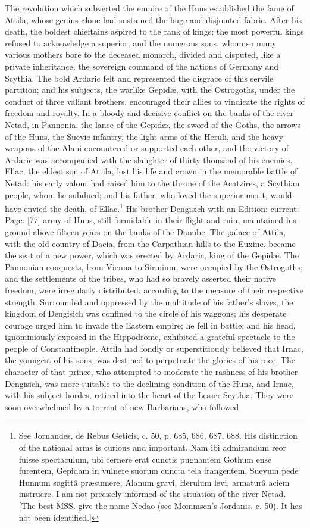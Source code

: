 The revolution which subverted the empire of the Huns established the fame of Attila, whose genius alone had sustained the huge and disjointed fabric. After his death, the boldest chieftains aspired to the rank of kings; the most powerful kings refused to acknowledge a superior; and the numerous sons, whom so many various mothers bore to the deceased monarch, divided and disputed, like a private inheritance, the sovereign command of the nations of Germany and Scythia. The bold Ardaric felt and represented the disgrace of this servile partition; and his subjects, the warlike Gepidæ, with the Ostrogoths, under the conduct of three valiant brothers, encouraged their allies to vindicate the rights of freedom and royalty. In a bloody and decisive conflict on the banks of the river Netad, in Pannonia, the lance of the Gepidæ, the sword of the Goths, the arrows of the Huns, the Suevic infantry, the light arms of the Heruli, and the heavy weapons of the Alani encountered or supported each other, and the victory of Ardaric was accompanied with the slaughter of thirty thousand of his enemies. Ellac, the eldest son of Attila, lost his life and crown in the memorable battle of Netad: his early valour had raised him to the throne of the Acatzires, a Scythian people, whom he subdued; and his father, who loved the superior merit, would have envied the death, of Ellac.\footnote{See Jornandes, de Rebus Geticis, c. 50, p. 685, 686, 687, 688. His distinction of the national arms is curious and important. Nam ibi admirandum reor fuisse spectaculum, ubi cernere erat cunctis pugnantem Gothum ense furentem, Gepidam in vulnere suorum cuncta tela frangentem, Suevum pede Hunnum sagittâ præsumere, Alanum gravi, Herulum levi, armaturâ aciem instruere. I am not precisely informed of the situation of the river Netad. [The best MSS. give the name Nedao (see Mommsen\texthebrew{}’s Jordanis, c. 50). It has not been identified.]} His brother Dengisich with an Edition: current; Page: [77] army of Huns, still formidable in their flight and ruin, maintained his ground above fifteen years on the banks of the Danube. The palace of Attila, with the old country of Dacia, from the Carpathian hills to the Euxine, became the seat of a new power, which was erected by Ardaric, king of the Gepidæ. The Pannonian conquests, from Vienna to Sirmium, were occupied by the Ostrogoths; and the settlements of the tribes, who had so bravely asserted their native freedom, were irregularly distributed, according to the measure of their respective strength. Surrounded and oppressed by the multitude of his father\texthebrew{}’s slaves, the kingdom of Dengisich was confined to the circle of his waggons; his desperate courage urged him to invade the Eastern empire; he fell in battle; and his head, ignominiously exposed in the Hippodrome, exhibited a grateful spectacle to the people of Constantinople. Attila had fondly or superstitiously believed that Irnac, the youngest of his sons, was destined to perpetuate the glories of his race. The character of that prince, who attempted to moderate the rashness of his brother Dengisich, was more suitable to the declining condition of the Huns, and Irnac, with his subject hordes, retired into the heart of the Lesser Scythia. They were soon overwhelmed by a torrent of new Barbarians, who followed 